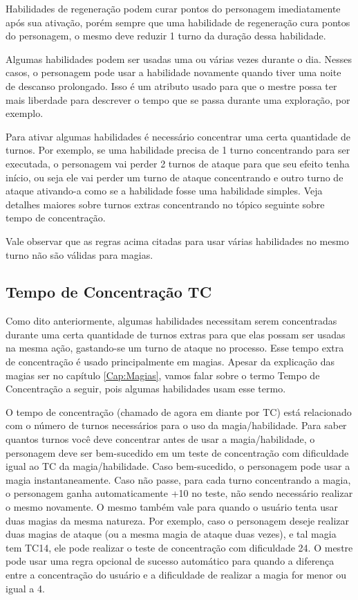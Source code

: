 Habilidades de regeneração podem curar pontos do personagem imediatamente após sua ativação, porém sempre que uma habilidade de regeneração cura pontos do personagem, o mesmo deve reduzir 1 turno da duração dessa habilidade.

Algumas habilidades podem ser usadas uma ou várias vezes durante o dia. Nesses casos, o personagem pode usar a habilidade novamente quando tiver uma noite de descanso prolongado. Isso é um atributo usado para que o mestre possa ter mais liberdade para descrever o tempo que se passa durante uma exploração, por exemplo.

Para ativar algumas habilidades é necessário concentrar uma certa quantidade de turnos. Por exemplo, se uma habilidade precisa de 1 turno concentrando para ser executada, o personagem vai perder 2 turnos de ataque para que seu efeito tenha início, ou seja ele vai perder um turno de ataque concentrando e outro turno de ataque ativando-a como se a habilidade fosse uma habilidade simples. Veja detalhes maiores sobre turnos extras concentrando no tópico seguinte sobre tempo de concentração.


Vale observar que as regras acima citadas para usar várias habilidades no mesmo turno não são válidas para magias.

\subsection{Tempo de Concentração TC}

Como dito anteriormente, algumas habilidades necessitam serem concentradas durante uma certa quantidade de turnos extras para que elas possam ser usadas na mesma ação, gastando-se um turno de ataque no processo. Esse tempo extra de concentração é usado principalmente em magias. Apesar da explicação das magias ser no capítulo \ref{Cap:Magias}, vamos falar sobre o termo Tempo de Concentração a seguir, pois algumas habilidades usam esse termo.

O tempo de concentração (chamado de agora em diante por TC) está relacionado com o número de turnos necessários para o uso da magia/habilidade. Para saber quantos turnos você deve concentrar antes de usar a magia/habilidade, o personagem deve ser bem-sucedido em um teste de concentração com dificuldade igual ao TC da magia/habilidade. Caso bem-sucedido, o personagem pode usar a magia instantaneamente. Caso não passe, para cada turno concentrando a magia, o personagem ganha automaticamente +10 no teste, não sendo necessário realizar o mesmo novamente. O mesmo também vale para quando o usuário tenta usar duas magias da mesma natureza. Por exemplo, caso o personagem deseje realizar duas magias de ataque (ou a mesma magia de ataque duas vezes), e tal magia tem TC14, ele pode realizar o teste de concentração com dificuldade 24. O mestre pode usar uma regra opcional de sucesso automático para quando a diferença entre a concentração do usuário e a dificuldade de realizar a magia for menor ou igual a 4.

